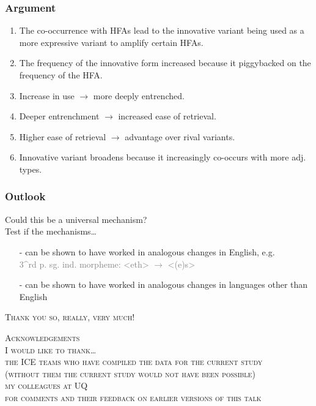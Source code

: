 \documentclass[12pt, table]{beamer}
\begin{document}
\begin{frame}
\frametitle{Argument}
\begin{enumerate}
\item The co-occurrence with HFAs lead to the innovative variant being used as a more expressive variant to amplify certain HFAs. 
\item The frequency of the innovative form increased because it piggybacked on the frequency of the HFA.
\item Increase in use $\rightarrow$ more deeply entrenched.
\item Deeper entrenchment $\rightarrow$ increased ease of retrieval.
\item Higher ease of retrieval $\rightarrow$ advantage over rival variants.
\item Innovative variant broadens because it increasingly co-occurs with more adj. types.
\end{enumerate} 
\end{frame}

\begin{frame}
\frametitle{Outlook}
Could this be a universal mechanism?\\[.5cm]
Test if the mechanisms\dots
\begin{itemize}
\item[-] can be shown to have worked in analogous changes in English, e.g.  \\
\textcolor{gray}{3^{rd} p. sg. ind. morpheme: <eth> $\rightarrow$ <(e)s>}
\item[-] can be shown to have worked in analogous changes in languages other than English
\end{itemize} 
\end{frame}

\begin{frame}
\begin{center}
\textsc{\textcolor{uq}{Thank you so, really, very much!}}\\[1cm]
\begin{scriptsize}
\textsc{\textcolor{uq}{Acknowledgements}\\[.25cm]
I would like to thank\dots\\[.25cm]
the ICE teams who have compiled the data for the current study \\
(without them the current study would not have been possible)\\[.25cm]
my colleagues at UQ \\
for comments and their feedback on earlier versions of this talk}
\end{scriptsize}
\end{center}
\end{frame}
\end{document}
